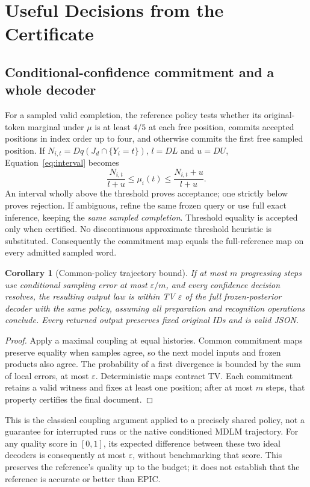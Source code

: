 \documentclass[12pt]{article}
\theoremstyle{readable}
\newtheorem{corollary}{Corollary}
\begin{document}
\section{Useful Decisions from the Certificate}

\subsection{Conditional-confidence commitment and a whole decoder}

For a sampled valid completion, the reference policy tests whether its
original-token marginal under $\mu$ is at least $4/5$ at each free position,
commits accepted positions in index order up to four, and otherwise commits
the first free sampled position. If $N_{i,t}=Dq(J_d\cap\{Y_i=t\})$,
$l=DL$ and $u=DU$, Equation~\eqref{eq:interval} becomes
\begin{equation}
 \frac{N_{i,t}}{l+u}\le\mu_i(t)\le\frac{N_{i,t}+u}{l+u}.
\end{equation}
An interval wholly above the threshold proves acceptance; one strictly below
proves rejection. If ambiguous, refine the same frozen query or use full exact
inference, keeping the \emph{same sampled completion}. Threshold equality is
accepted only when certified. No discontinuous approximate threshold heuristic
is substituted. Consequently the commitment map equals the full-reference
map on every admitted sampled word.

\begin{corollary}[Common-policy trajectory bound]
If at most $m$ progressing steps use conditional sampling error at most
$\varepsilon/m$, and every confidence decision resolves, the resulting output
law is within TV $\varepsilon$ of the full frozen-posterior decoder with the
same policy, assuming all preparation and recognition operations conclude.
Every returned output preserves fixed original IDs and is valid JSON.
\end{corollary}
\begin{proof}
Apply a maximal coupling at equal histories. Common commitment maps preserve
equality when samples agree, so the next model inputs and frozen products also
agree. The probability of a first divergence is bounded by the sum of local
errors, at most $\varepsilon$. Deterministic maps contract TV. Each commitment
retains a valid witness and fixes at least one position; after at most $m$
steps, that property certifies the final document.
\end{proof}
This is the classical coupling argument applied to a precisely shared policy,
not a guarantee for interrupted runs or the native conditioned MDLM trajectory.
For any quality score in $[0,1]$, its expected difference between these two
ideal decoders is consequently at most $\varepsilon$, without benchmarking
that score. This preserves the reference's quality up to the budget; it does
not establish that the reference is accurate or better than EPIC.
\end{document}
